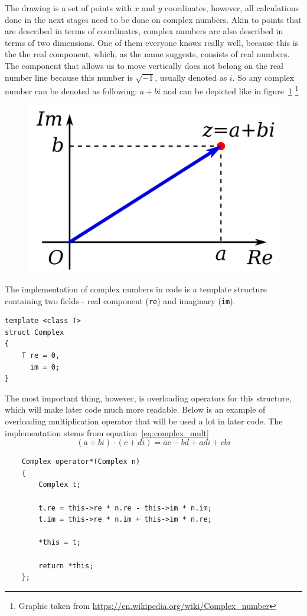 \documentclass[titlepage]{article}
\begin{document}
    The drawing is a set of points with $x$ and $y$ coordinates, however, all 
    calculations done in the next stages need to be done on complex numbers.
    Akin to points that are described in terms of coordinates, complex numbers
    are also described in terms of
    two dimensions. One of them everyone knows really well, because this is the 
    the real component, which, as the name suggests, consists of real numbers.
    The component that allows us to move vertically does not belong on the real 
    number line because this number is $\sqrt{-1}$, usually denoted as $i$. So
    any complex number can be denoted as following: $a + bi$ and can be depicted
    like in figure~\ref{fig:complex_number}
    \footnote{Graphic taken from \url{https://en.wikipedia.org/wiki/Complex_number}}
    \begin{figure}[H]
        \caption{}
        \centering
        \includegraphics[width=0.3\linewidth]{imaginary_number}
        \label{fig:complex_number}
    \end{figure}
    The implementation of complex numbers in code is a template structure 
    containing two fields - real component (\texttt{re}) and imaginary (\texttt{im}).
    \begin{verbatim}
template <class T>
struct Complex
{
    T re = 0, 
      im = 0;
}
    \end{verbatim}
    The most important thing, however, is overloading operators for this structure,
    which will make later code much more readable. Below is an example of overloading
    multiplication operator that will be used a lot in later code. The implementation
    stems from equation~\eqref{eq:complex_mult}
    \begin{equation}\label{eq:complex_mult}
        (a + bi) \cdot (c + di) = ac - bd + adi + cbi 
    \end{equation}
    \begin{verbatim}
    Complex operator*(Complex n)
    {
        Complex t;

        t.re = this->re * n.re - this->im * n.im;
        t.im = this->re * n.im + this->im * n.re;

        *this = t;

        return *this;
    };
    \end{verbatim}
\end{document}
